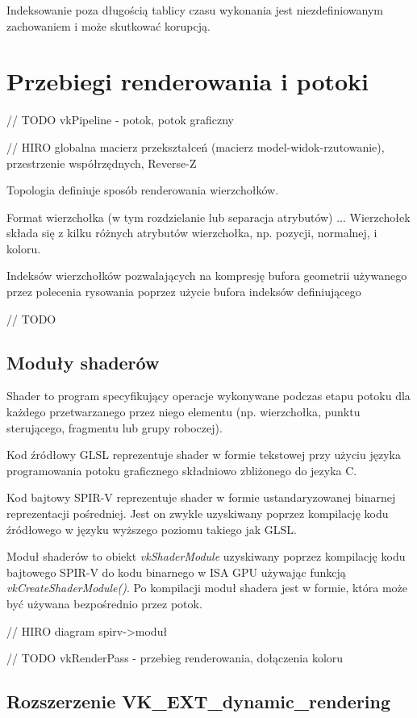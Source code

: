 Indeksowanie poza długością tablicy czasu wykonania jest niezdefiniowanym zachowaniem i może skutkować korupcją.

\section{Przebiegi renderowania i potoki}

// TODO vkPipeline - potok, potok graficzny

// HIRO globalna macierz przekształceń (macierz model-widok-rzutowanie), przestrzenie współrzędnych, Reverse-Z

Topologia definiuje sposób renderowania wierzchołków.

Format wierzchołka (w tym rozdzielanie lub separacja atrybutów) ...
Wierzchołek składa się z kilku różnych atrybutów wierzchołka, np. pozycji, normalnej, i koloru.

Indeksów wierzchołków pozwalających na kompresję bufora geometrii używanego przez polecenia rysowania poprzez użycie bufora indeksów definiującego 

// TODO

\subsection{Moduły shaderów}

Shader to program specyfikujący operacje wykonywane podczas etapu potoku dla każdego przetwarzanego przez niego elementu (np. wierzchołka, punktu sterującego, fragmentu lub grupy roboczej).

Kod źródłowy GLSL reprezentuje shader w formie tekstowej przy użyciu języka programowania potoku graficznego składniowo zbliżonego do jezyka C.

Kod bajtowy SPIR-V reprezentuje shader w formie ustandaryzowanej binarnej reprezentacji pośredniej. Jest on zwykle uzyskiwany poprzez kompilację kodu źródłowego w języku wyższego poziomu takiego jak GLSL.

Moduł shaderów to obiekt \textit{vkShaderModule} uzyskiwany poprzez kompilację kodu bajtowego SPIR-V do kodu binarnego w ISA GPU używając funkcją \textit{vkCreateShaderModule()}.
Po kompilacji moduł shadera jest w formie, która może być używana bezpośrednio przez potok.

// HIRO diagram spirv->moduł

// TODO vkRenderPass - przebieg renderowania, dołączenia koloru

\subsection{Rozszerzenie VK\_EXT\_dynamic\_rendering}

